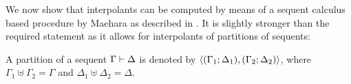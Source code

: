 \begin{comment}
	Suppose $\pi$ contains an instance of \lkrule{w}{r} such that the equality symbol occurs in the principal formula $A$. 
	Then as it does not occur in the end sequent, it is removed by either an instance of an equality rule or the cut rule. 
	Suppose it is removed via an equality rule. We consider the case of  $\lkrule{=}{l_1}$.
	\begin{prooftree}

		\AxiomCm{\Lambda, A\occurat{t}{p} \proves \Theta}

		\AxiomCm{\varphi}
		\noLine
		\UnaryInfCm{\Gamma \proves \Delta}
		\RightLabelm{\lkrule{w}{r}}
		\UnaryInfCm{\Gamma \proves \Delta, s=t}
		\noLine
		\UnaryInfCm{\vdots}
		\noLine
		\UnaryInfCm{\Sigma \proves \Pi, s=t}

		\RightLabelm{\lkrule{=}{l_1}}                        
		\BinaryInfm{\Lambda, \Sigma, A\occurat{s}{p} \fCenter \Theta, \Pi }
	\end{prooftree}



	not finished


	(proof might become longer, but how does that work? don't inessential cuts remain?)

\end{proof}
\end{comment}


We now show that interpolants can be computed by means of a sequent calculus based procedure by Maehara as described in \cite[Lemma\ 6.5]{takeuti87}.
It is slightly stronger than the required statement as it allows for interpolants of partitions of sequents:

\begin{defi}
	A {partition} of a sequent $\Gamma \vdash \Delta$ is denoted by $ \langle (\Gamma_1; \Delta_1), (\Gamma_2; \Delta_2)\rangle $, where
	$\Gamma_1 \uplus \Gamma_2 = \Gamma$ and 
	$\Delta_1 \uplus \Delta_2 = \Delta$.
\end{defi}



